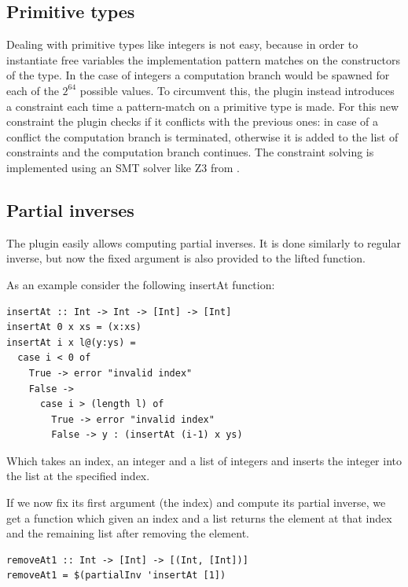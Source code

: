 \documentclass[12pt,a4paper, dvipsnames,usenames]{article}
\begin{document}
\subsection{Primitive types}
\label{sec:prim}

Dealing with primitive types like integers is not easy, because in order
to instantiate free variables the implementation pattern matches on the constructors
of the type. In the case of integers a computation branch would be spawned
for each of the 
$2^{64}$ possible values. To circumvent this, the plugin instead introduces
a constraint each time a pattern-match on a primitive type is made.
For this new constraint the plugin checks if it conflicts with the
previous ones: in case of a conflict the computation branch is terminated, otherwise
it is added to the list of constraints and the computation branch continues.
The constraint solving is implemented using an SMT solver
like Z3 from \cite{Moura2008Z3}.

\subsection{Partial inverses}

The plugin easily allows computing partial inverses.
It is done similarly to regular inverse, but now the
fixed argument is also provided to the lifted function.

As an example consider the following insertAt function:

\begin{verbatim}
insertAt :: Int -> Int -> [Int] -> [Int]
insertAt 0 x xs = (x:xs)
insertAt i x l@(y:ys) =
  case i < 0 of
    True -> error "invalid index"
    False ->
      case i > (length l) of
        True -> error "invalid index"
        False -> y : (insertAt (i-1) x ys)
\end{verbatim}

Which takes an index, an integer and a list of integers and
inserts the integer into the list at the specified index.

If we now fix its first argument (the index) and compute
its partial inverse, we get a function which
given an index and a list returns the element at that index
and the remaining list after removing the element.

\begin{verbatim}
removeAt1 :: Int -> [Int] -> [(Int, [Int])]
removeAt1 = $(partialInv 'insertAt [1])
\end{verbatim}
\end{document}
